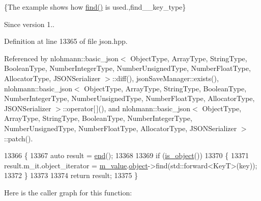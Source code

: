 \{The example shows how {\ttfamily \hyperlink{classnlohmann_1_1basic__json_a89eb3928f57903677051c80534be9cb1}{find()}} is used.,find\+\_\+\+\_\+key\+\_\+type\}

\begin{DoxySince}{Since}
version 1.. 
\end{DoxySince}


Definition at line 13365 of file json.\+hpp.



Referenced by nlohmann\+::basic\+\_\+json$<$ Object\+Type, Array\+Type, String\+Type, Boolean\+Type, Number\+Integer\+Type, Number\+Unsigned\+Type, Number\+Float\+Type, Allocator\+Type, J\+S\+O\+N\+Serializer $>$\+::diff(), json\+Save\+Manager\+::exists(), nlohmann\+::basic\+\_\+json$<$ Object\+Type, Array\+Type, String\+Type, Boolean\+Type, Number\+Integer\+Type, Number\+Unsigned\+Type, Number\+Float\+Type, Allocator\+Type, J\+S\+O\+N\+Serializer $>$\+::operator\mbox{[}$\,$\mbox{]}(), and nlohmann\+::basic\+\_\+json$<$ Object\+Type, Array\+Type, String\+Type, Boolean\+Type, Number\+Integer\+Type, Number\+Unsigned\+Type, Number\+Float\+Type, Allocator\+Type, J\+S\+O\+N\+Serializer $>$\+::patch().


\begin{DoxyCode}
13366     \{
13367         \textcolor{keyword}{auto} result = \hyperlink{classnlohmann_1_1basic__json_a13e032a02a7fd8a93fdddc2fcbc4763c}{end}();
13368 
13369         \textcolor{keywordflow}{if} (\hyperlink{classnlohmann_1_1basic__json_af8f511af124e82e4579f444b4175787c}{is\_object}())
13370         \{
13371             result.m\_it.object\_iterator = \hyperlink{classnlohmann_1_1basic__json_aeb0814f76966f99290cb29e127c90a77}{m\_value}.\hyperlink{unionnlohmann_1_1basic__json_1_1json__value_a4a2209bb26e7088cd36bf24824ab5521}{object}->find(std::forward<KeyT>(key));
13372         \}
13373 
13374         \textcolor{keywordflow}{return} result;
13375     \}
\end{DoxyCode}
Here is the caller graph for this function\+:
\mbox{\label{classnlohmann_1_1basic__json_ae625a0647486edf2bb38c849ca67f934}} 
